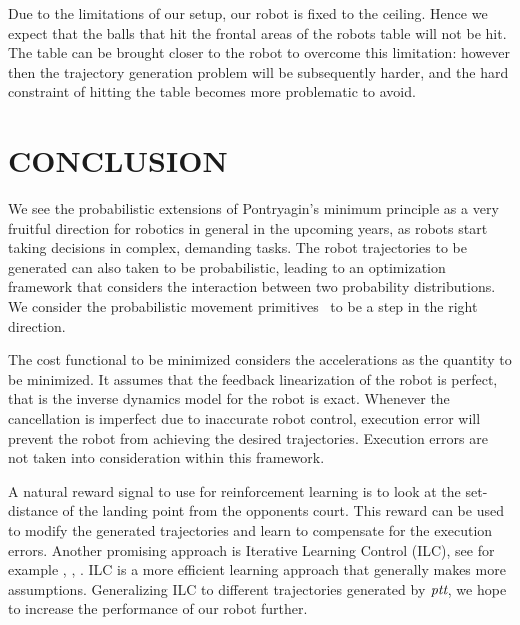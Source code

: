 \documentclass[letterpaper, 10 pt, conference]{ieeeconf}
\newcommand{\alg}{\emph{ptt}} %
\begin{document}
Due to the limitations of our setup, our robot is fixed to the ceiling. Hence we expect that the balls that hit the frontal areas of the robots table will not be hit. The table can be brought closer to the robot to overcome this limitation: however then the trajectory generation problem will be subsequently harder, and the hard constraint of hitting the table becomes more problematic to avoid.


\section{CONCLUSION}\label{end}

We see the probabilistic extensions of Pontryagin's minimum principle as a very fruitful direction for robotics in general in the upcoming years, as robots start taking decisions in complex, demanding tasks. The robot trajectories to be generated can also taken to be probabilistic, leading to an optimization framework that considers the interaction between two probability distributions. We consider the probabilistic movement primitives~\cite{Paraschos13} to be a step in the right direction.


The cost functional to be minimized considers the accelerations as the quantity to be minimized. It assumes that the feedback linearization of the robot is perfect, that is the inverse dynamics model for the robot is exact. Whenever the cancellation is imperfect due to inaccurate robot control, execution error will prevent the robot from achieving the desired trajectories. Execution errors are not taken into consideration within this framework. 

A natural reward signal to use for reinforcement learning is to look at the set-distance of the landing point from the opponents court. This reward can be used to modify the generated trajectories and learn to compensate for the execution errors. Another promising approach is Iterative Learning Control (ILC), see for example \cite{Bristow06}, \cite{Longman2000}, \cite{Koc15}. ILC is a more efficient learning approach that generally makes more assumptions. Generalizing ILC to different trajectories generated by $\alg$, we hope to increase the performance of our robot further. 


%
%

\end{document}
